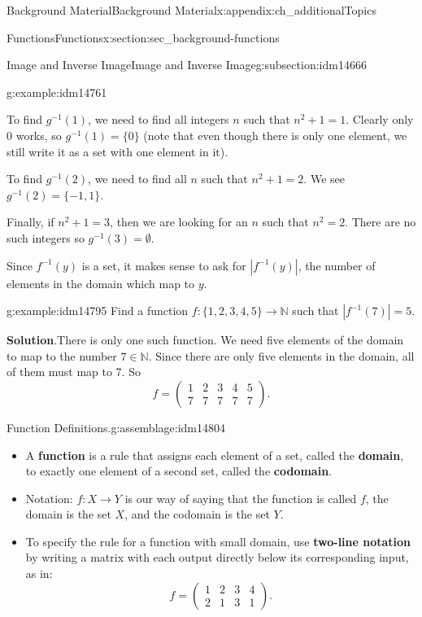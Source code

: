 \documentclass[oneside,10pt,]{book}
\newcommand{\terminology}[1]{\textbf{#1}}
\numberwithin{equation}{chapter}
\def\N{\mathbb N}
\def\inv{^{-1}}
\newcommand{\card}[1]{\left| #1 \right|}
\newcommand{\amp}{&}
\begin{document}
\begin{appendixptx}{Background Material}{}{Background Material}{}{}{x:appendix:ch_additionalTopics}
\begin{sectionptx}{Functions}{}{Functions}{}{}{x:section:sec_background-functions}
\begin{subsectionptx}{Image and Inverse Image}{}{Image and Inverse Image}{}{}{g:subsection:idm14666}
\begin{example}{}{g:example:idm14761}
\par
To find \(g\inv(1)\), we need to find all integers \(n\) such that \(n^2 + 1 = 1\). Clearly only 0 works, so \(g\inv(1) = \{0\}\) (note that even though there is only one element, we still write it as a set with one element in it).%
\par
To find \(g\inv(2)\), we need to find all \(n\) such that \(n^2 + 1 = 2\). We see \(g\inv(2) = \{-1,1\}\).%
\par
Finally, if \(n^2 + 1 = 3\), then we are looking for an \(n\) such that \(n^2 = 2\). There are no such integers so \(g\inv(3) = \emptyset\).%
\end{example}
Since \(f\inv(y)\) is a set, it makes sense to ask for \(\card{f\inv(y)}\), the number of elements in the domain which map to \(y\).%
\begin{example}{}{g:example:idm14795}%
Find a function \(f:\{1,2,3,4,5\} \to \N\) such that \(\card{f\inv(7)} = 5\).%
\par\smallskip%
\noindent\textbf{Solution}.\hypertarget{g:solution:idm14800}{}\quad{}There is only one such function. We need five elements of the domain to map to the number \(7 \in \N\). Since there are only five elements in the domain, all of them must map to 7. So%
\begin{equation*}
f = \begin{pmatrix}1 \amp 2 \amp 3 \amp 4 \amp 5 \\ 7 \amp 7 \amp 7 \amp 7 \amp 7\end{pmatrix}.
\end{equation*}
%
\end{example}
\begin{assemblage}{Function Definitions.}{g:assemblage:idm14804}%
%
\begin{itemize}[label=\textbullet]
\item{}A \terminology{function} is a rule that assigns each element of a set, called the \terminology{domain}, to exactly one element of a second set, called the \terminology{codomain}.%
\item{}Notation: \(f:X \to Y\) is our way of saying that the function is called \(f\), the domain is the set \(X\), and the codomain is the set \(Y\).%
\item{}To specify the rule for a function with small domain, use \terminology{two-line notation} by writing a matrix with each output directly below its corresponding input, as in:%
\begin{equation*}
f = \begin{pmatrix}1 \amp 2 \amp 3 \amp 4 \\ 2 \amp 1 \amp 3 \amp 1 \end{pmatrix}.

\end{equation*}
\end{itemize}
\end{assemblage}
\end{subsectionptx}
\end{sectionptx}
\end{appendixptx}
\end{document}
